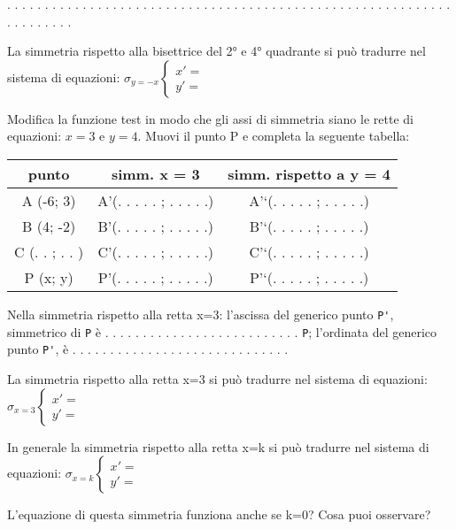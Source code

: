 . . . . . . . . . . . . . . . . . . . . . . . . . . . . . . . . . . . . . . . .
. . . . . . . . . . . . . . . . . . . . . . . . . . . .

La simmetria rispetto alla bisettrice del 2° e 4° quadrante si può tradurre
nel sistema di equazioni:
\(\sigma_{y = -x} \left \{
\begin{array}{l}
x' = {} \\
y' = {}
\end{array} \right .\)

Modifica la funzione test in modo che gli assi di simmetria siano le rette di
equazioni: \(x=3\) e \(y=4\).
Muovi il punto P e completa la seguente tabella:

\begin{tabular}{|c|c|c|}
\hline

punto
 & 
simm. x = 3
 & 
simm. rispetto a y = 4
\\
\hline
A (-6; 3)
 & 
A'(. . . . . ; . . . . .)
 & 
A'`(. . . . . ; . . . . .)
\\
\hline
B (4; -2)
 & 
B'(. . . . . ; . . . . .)
 & 
B'`(. . . . . ; . . . . .)
\\
\hline
C (. . ; . . )
 & 
C'(. . . . . ; . . . . .)
 & 
C'`(. . . . . ; . . . . .)
\\
\hline
P (x; y)
 & 
P'(. . . . . ; . . . . .)
 & 
P'`(. . . . . ; . . . . .)
\\
\hline\end{tabular}

Nella simmetria rispetto alla retta x=3:
l'ascissa del generico punto \lstinline{P'}, 
simmetrico di \lstinline{P} 
è . . . . . . . . . . . . . . . . . . . . . . . . . .
\lstinline{P}; 
l'ordinata del generico punto \lstinline{P'}, 
è . . . . . . . . . . . . . . . . . . . . . . . . . . . . .

La simmetria rispetto alla retta x=3 si può tradurre nel sistema di equazioni:
\(\sigma_{x = 3} \left \{
\begin{array}{l}
x' = {} \\
y' = {}
\end{array} \right .\)

In generale la simmetria rispetto alla retta x=k si può tradurre nel sistema
di equazioni:
\(\sigma_{x = k} \left \{
\begin{array}{l}
x' = {} \\
y' = {}
\end{array} \right .\)

L'equazione di questa simmetria funziona anche se k=0? Cosa puoi osservare?

